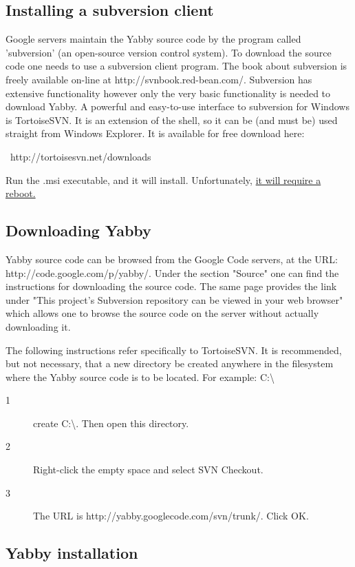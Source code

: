 \subsection{Installing a subversion client}

Google servers maintain the Yabby source code by the program called
'subversion' (an open-source version control system). To download the source
code one needs to use a subversion client program. The book about subversion
is freely available on-line at http://svnbook.red-bean.com/. Subversion has
extensive functionality however only the very basic functionality is needed to
download Yabby. A powerful and easy-to-use interface to subversion for Windows
is TortoiseSVN. It is an extension of the shell, so it can be (and must be)
used straight from Windows Explorer. It is available for free download here:

\ http://tortoisesvn.net/downloads

Run the .msi executable, and it will install. Unfortunately, {\underline{it
will require a reboot.}}

\subsection{Downloading Yabby}

Yabby source code can be browsed from the Google Code servers, at the URL:
http://code.google.com/p/yabby/. Under the section "Source" one can find the
instructions for downloading the source code. The same page provides the link
under "This project's Subversion repository can be viewed in your web browser"
which allows one to browse the source code on the server without actually
downloading it.

The following instructions refer specifically to TortoiseSVN. It is
recommended, but not necessary, that a new directory be created anywhere in
the filesystem where the Yabby source code is to be located. For example:
C:{\backslash}
\begin{description}
  \item[1] create C:{\backslash}. Then open this directory.
  
  \item[2] Right-click the empty space and select SVN Checkout.
  
  \item[3] The URL is http://yabby.googlecode.com/svn/trunk/. Click OK.
\end{description}

\subsection{Yabby installation}

